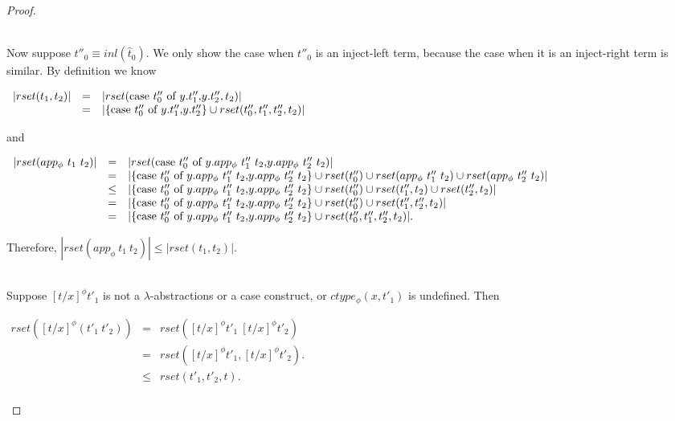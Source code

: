 \begin{proof}
\begin{itemize}
\begin{itemize}
    \ \\
    Now suppose $t''_0 \equiv inl(\hat{t}_0)$.  We only show the case when $t''_0$ is an
    inject-left term, because the case when it is an inject-right term is similar.  By
    definition we know 
    \begin{center}
      \begin{math}
        \begin{array}{lll}
          |rset(t_1,t_2)| & = & |rset(\mbox{case}\ t''_0\ \text{of}\ y\text{.}t''_1\text{,}y\text{.}t''_2, t_2)|\\
          & = & |\{\mbox{case}\ t''_0\ \text{of}\ y\text{.}t''_1\text{,}y\text{.}t''_2\} \cup rset(t''_0,t''_1,t''_2,t_2)|
        \end{array}
      \end{math}
    \end{center}
    and 
    \begin{center}
      \begin{math}
        \begin{array}{lll}
          |rset(app_\phi\ t_1\ t_2)| & = & |rset(\ccon{t''_0}{y}{app_\phi\ t''_1\ t_2}{app_\phi\ t''_2\ t_2})|\\
          & = & |\{\ccon{t''_0}{y}{app_\phi\ t''_1\ t_2}{app_\phi\ t''_2\ t_2}\} \cup 
          rset(t''_0) \cup rset(app_\phi\ t''_1\ t_2) \cup rset(app_\phi\ t''_2\ t_2)|\\
          & \leq & |\{\ccon{t''_0}{y}{app_\phi\ t''_1\ t_2}{app_\phi\ t''_2\ t_2}\} \cup 
          rset(t''_0) \cup rset(t''_1, t_2) \cup rset(t''_2, t_2)|\\
          & = & |\{\ccon{t''_0}{y}{app_\phi\ t''_1\ t_2}{app_\phi\ t''_2\ t_2}\} \cup 
          rset(t''_0) \cup rset(t''_1, t''_2, t_2)|\\
          & = & |\{\ccon{t''_0}{y}{app_\phi\ t''_1\ t_2}{app_\phi\ t''_2\ t_2}\} \cup 
          rset(t''_0, t''_1, t''_2, t_2)|.
        \end{array}
      \end{math}
    \end{center}
    Therefore, $|rset(app_\phi\ t_1\ t_2)| \leq |rset(t_1,t_2)|$.
  \end{itemize}

  \ \\
  \noindent
  Suppose $[t/x]^\phi t'_1$ is not a $\lambda$-abstractions or a case construct, or $ctype_\phi(x,t'_1)$ is undefined.  Then
  \begin{center}
    \begin{math}
      \begin{array}{lll}
        rset([t/x]^\phi (t'_1\ t'_2)) & = & rset([t/x]^\phi t'_1\ [t/x]^\phi t'_2)\\
        & = & rset([t/x]^\phi t'_1, [t/x]^\phi t'_2).\\
        & \leq & rset(t'_1, t'_2, t).\\
      \end{array}
    \end{math}
  \end{center}
  

\end{itemize}
\end{proof}
